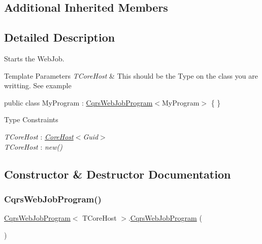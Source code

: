 \subsection*{Additional Inherited Members}


\subsection{Detailed Description}
Starts the Web\+Job. 


\begin{DoxyTemplParams}{Template Parameters}
{\em T\+Core\+Host} & This should be the Type on the class you are writting. See example\\
\hline
\end{DoxyTemplParams}


public class My\+Program \+: \hyperlink{classCqrsWebJobProgram}{Cqrs\+Web\+Job\+Program}$<$My\+Program$>$ \{ \} \begin{Desc}
\item[Type Constraints]\begin{description}
\item[{\em T\+Core\+Host} : {\em \hyperlink{classCqrs_1_1Ninject_1_1Azure_1_1WebJobs_1_1CqrsNinjectJobHost_a2c166839548b7c238a9462b46bd8e555_a2c166839548b7c238a9462b46bd8e555}{Core\+Host}$<$Guid$>$}]\item[{\em T\+Core\+Host} : {\em new()}]\end{description}
\end{Desc}


\subsection{Constructor \& Destructor Documentation}
\mbox{\label{classCqrsWebJobProgram_a7a7e74a9c2358374e3627abb36bd4462_a7a7e74a9c2358374e3627abb36bd4462}} 
\subsubsection{\texorpdfstring{Cqrs\+Web\+Job\+Program()}{CqrsWebJobProgram()}}
{\footnotesize\ttfamily \hyperlink{classCqrsWebJobProgram}{Cqrs\+Web\+Job\+Program}$<$ T\+Core\+Host $>$.\hyperlink{classCqrsWebJobProgram}{Cqrs\+Web\+Job\+Program} (\begin{DoxyParamCaption}{ }\end{DoxyParamCaption})}




